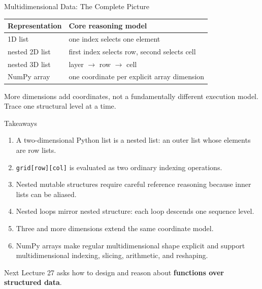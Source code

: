 \documentclass[aspectratio=169,10pt]{beamer}
\begin{document}
\begin{frame}{Multidimensional Data: The Complete Picture}
  \begin{center}
    \renewcommand{\arraystretch}{1.32}
    \begin{tabular}{l|l}
      \textbf{Representation} & \textbf{Core reasoning model} \\\hline
      1D list & one index selects one element \\
      nested 2D list & first index selects row, second selects cell \\
      nested 3D list & layer $\rightarrow$ row $\rightarrow$ cell \\
      NumPy array & one coordinate per explicit array dimension
    \end{tabular}
  \end{center}

  \begin{keyidea}
    More dimensions add coordinates, not a fundamentally different execution model. Trace one structural level at a time.
  \end{keyidea}
\end{frame}

\begin{frame}{Takeaways}
  \begin{enumerate}
    \item A two-dimensional Python list is a nested list: an outer list whose elements are row lists.
    \item \texttt{grid[row][col]} is evaluated as two ordinary indexing operations.
    \item Nested mutable structures require careful reference reasoning because inner lists can be aliased.
    \item Nested loops mirror nested structure: each loop descends one sequence level.
    \item Three and more dimensions extend the same coordinate model.
    \item NumPy arrays make regular multidimensional shape explicit and support multidimensional indexing, slicing, arithmetic, and reshaping.
  \end{enumerate}

  \begin{block}{Next}
    Lecture 27 asks how to design and reason about \textbf{functions over structured data}.
  \end{block}
\end{frame}
\end{document}
